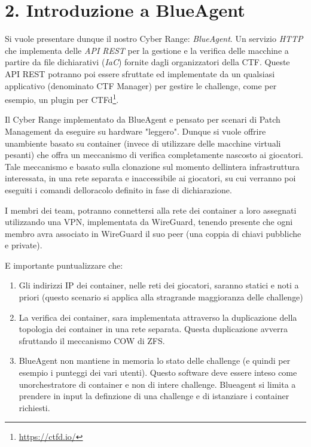 \section{2. Introduzione a BlueAgent}\label{2-introduzione-a-blueagent}

Si vuole presentare dunque il nostro Cyber Range: \emph{BlueAgent}. Un
servizio \emph{HTTP} che implementa delle \emph{API REST} per la
gestione e la verifica delle macchine a partire da file dichiarativi
(\emph{IaC}) fornite dagli organizzatori della CTF. Queste API REST
potranno poi essere sfruttate ed implementate da un qualsiasi
applicativo (denominato CTF Manager) per gestire le challenge, come per
esempio, un plugin per CTFd\footnote{\label{fn:ref_14}\url{https://ctfd.io/}}.

Il Cyber Range implementato da BlueAgent e\textquotesingle{} pensato per
scenari di Patch Management da eseguire su hardware "leggero". Dunque si
vuole offrire un\textquotesingle ambiente basato su container (invece di
utilizzare delle macchine virtuali pesanti) che offra un meccanismo di
verifica completamente nascosto ai giocatori. Tale meccanismo
e\textquotesingle{} basato sulla clonazione sul momento
dell\textquotesingle intera infrastruttura interessata, in una rete
separata e inaccessibile ai giocatori, su cui verranno poi eseguiti i
comandi dell\textquotesingle oracolo definito in fase di dichiarazione.

I membri dei team, potranno connettersi alla rete dei container a loro
assegnati utilizzando una VPN, implementata da WireGuard, tenendo
presente che ogni membro avra associato in WireGuard il suo peer (una
coppia di chiavi pubbliche e private).

E\textquotesingle{} importante puntualizzare che:

\begin{enumerate}
\def\labelenumi{\arabic{enumi}.}
\tightlist
\item
  Gli indirizzi IP dei container, nelle reti dei giocatori, saranno
  statici e noti a priori (questo scenario si applica alla stragrande
  maggioranza delle challenge)
\item
  La verifica dei container, sara implementata attraverso la
  duplicazione della topologia dei container in una rete separata.
  Questa duplicazione avverra sfruttando il meccanismo COW di ZFS.
\item
  BlueAgent non mantiene in memoria lo stato delle challenge (e quindi
  per esempio i punteggi dei vari utenti). Questo software deve essere
  inteso come un\textquotesingle orchestratore di container e non di
  intere challenge. Blueagent si limita a prendere in input la
  definzione di una challenge e di istanziare i container richiesti.
\end{enumerate}

